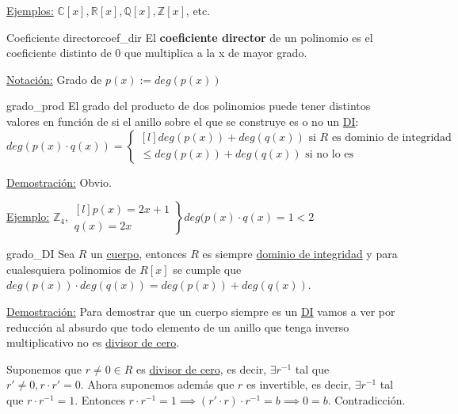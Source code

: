\documentclass[10pt, a4paper]{article}
\newcommand{\R}{\mathbb{R}}
\newcommand{\Z}{\mathbb{Z}}
\newcommand{\C}{\mathbb{C}}
\newcommand{\Q}{\mathbb{Q}}
\newcommand{\ej}{\underline{Ejemplo:} }
\newcommand{\ejs}{\underline{Ejemplos:} }
\newcommand{\nota}{\underline{Notación:} }
\newcommand{\demo}{\underline{Demostración:} }
\begin{document}
\ejs $\C[x], \R[x], \Q[x], \Z[x]$, etc.

\begin{definition}{Coeficiente director}{coef_dir}
El \textbf{coeficiente director} de un polinomio es el coeficiente distinto de 0 que multiplica a la x de mayor grado.
\end{definition}

\nota Grado de $p(x) := deg(p(x))$

\vspace{3mm}

\begin{proposition}{}{grado_prod}
El grado del producto de dos polinomios puede tener distintos valores en función de si el anillo sobre el que se construye es o no un \hyperref[def:DI]{DI}:
\[
deg(p(x) \cdot q(x)) = \left \{
\begin{matrix*}[l]
deg(p(x)) + deg(q(x)) \text{ si $R$ es dominio de integridad} \\
\leq deg(p(x)) + deg(q(x)) \text{ si no lo es}
\end{matrix*} \right .
\]
\end{proposition}

\demo Obvio.

\vspace{3mm}

\ej $\Z_4, \left .
\begin{matrix*}[l]
p(x) = 2x + 1 \\
q(x) = 2x
\end{matrix*} \right \}
deg(p(x) \cdot q(x) = 1 < 2$

\vspace{3mm}

\begin{proposition}{}{grado_DI}
 Sea $R$ un \hyperref[def:cuerpo]{cuerpo}, entonces $R$ es siempre \hyperref[def:DI]{dominio de integridad} y para cualesquiera polinomios de $R[x]$ se cumple que $deg(p(x)) \cdot deg(q(x)) = deg(p(x)) + deg(q(x))$.	
\end{proposition} 
 
\demo Para demostrar que un cuerpo siempre es un \hyperref[def:DI]{DI} vamos a ver por reducción al absurdo que todo elemento de un anillo que tenga inverso multiplicativo no es \hyperref[def:div_cero]{divisor de cero}.

Suponemos que $r \neq 0 \in R$ es \hyperref[def:div_cero]{divisor de cero}, es decir, $\exists r^{-1}$ tal que $r' \neq 0, r \cdot r' = 0$. Ahora suponemos además que $r$ es invertible, es decir, $\exists r^{-1}$ tal que $r \cdot r^{-1} = 1$. Entonces $r \cdot r^{-1} = 1 \implies (r' \cdot r) \cdot r^{-1} = b \implies 0 = b$. Contradicción.
\end{document}
